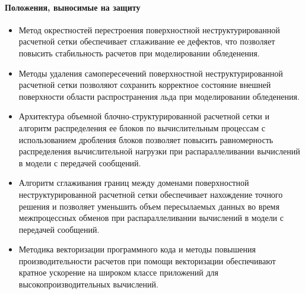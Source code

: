 \paragraph{Положения, выносимые на защиту}
\begin{itemize}[noitemsep,topsep=0pt,parsep=0pt,partopsep=0pt]
\item Метод окрестностей перестроения поверхностной неструктурированной расчетной сетки обеспечивает сглаживание ее дефектов, что позволяет повысить стабильность расчетов при моделировании обледенения.
\item Методы удаления самопересечений поверхностной не\-структурированной расчетной сетки позволяют сохранить корректное состояние внешней поверхности области распространения льда при моделировании обледенения.
\item Архитектура объемной блочно-структурированной расчетной сетки и алгоритм распределения ее блоков по вычислительным процессам с использованием дробления блоков позволяет повысить равномерность распределения вычислительной нагрузки при распараллеливании вычислений в модели с передачей сообщений.
\item Алгоритм сглаживания границ между доменами поверхностной неструктурированной расчетной сетки обеспечивает нахождение точного решения и позволяет уменьшить объем пересылаемых данных во время межпроцессных обменов при распараллеливании вычислений в модели с передачей сообщений.
\item Методика векторизации программного кода и методы повышения производительности расчетов при помощи векторизации обеспечивают кратное ускорение на широком классе приложений для высокопроизводительных вычислений.
\end{itemize}